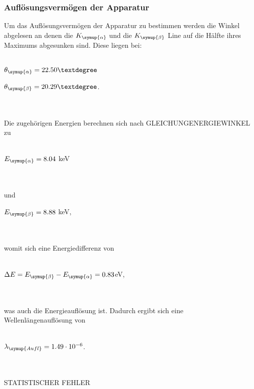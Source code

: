     \subsubsection{Auflösungsvermögen der Apparatur}
        \label{sec:cu} 
        Um das Auflösungsvermögen der Apparatur zu bestimmen werden die Winkel abgelesen an denen die $K_{\symup{\alpha}}$ und die $K_{\symup{\beta}}$
        Line auf die Hälfte ihres Maximums abgesunken sind.
        Diese liegen bei:
        \\ \\
        \centerline{$\theta_{\symup{\alpha}} = 22.50°$}
        \centerline{$\theta_{\symup{\beta}} = 20.29°$.}
        \\ \\
        Die zugehörigen Energien berechnen sich nach GLEICHUNGENERGIEWINKEL zu
        \\ \\
        \centerline{$E_{\symup{\alpha}} = 8.04$ keV}
        \\ \\
        und 
        \centerline{$E_{\symup{\beta}} = 8.88$ keV,}
        \\ \\
        womit sich eine Energiedifferenz von 
        \\ \\
        \centerline{$\Delta E = E_{\symup{\beta}} - E_{\symup{\alpha}} = 0.83$eV,}
        \\ \\
        was auch die Energieauflösung ist.
        Dadurch ergibt sich eine Wellenlängenauflösung von 
        \\ \\
        \centerline{$\lambda_{\symup{Aufl}} = 1.49 \cdot 10^{-6}$.}
        \\ \\

        STATISTISCHER FEHLER
